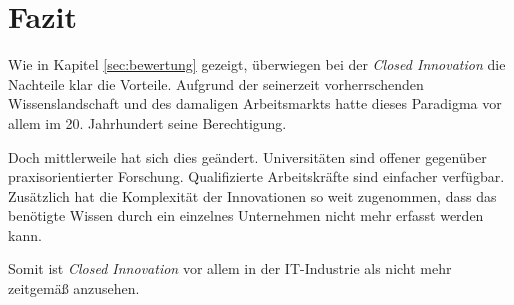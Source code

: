 \section{Fazit}\label{sec:fazit}
Wie in Kapitel \ref{sec:bewertung} gezeigt, überwiegen bei der \textit{Closed Innovation}
die Nachteile klar die Vorteile.
Aufgrund der seinerzeit vorherrschenden Wissenslandschaft und des damaligen Arbeitsmarkts
hatte dieses Paradigma vor allem im 20. Jahrhundert seine Berechtigung.

Doch mittlerweile hat sich dies geändert.
Universitäten sind offener gegenüber praxisorientierter Forschung.
Qualifizierte Arbeitskräfte sind einfacher verfügbar.
Zusätzlich hat die Komplexität der Innovationen so weit zugenommen,
dass das benötigte Wissen durch ein einzelnes Unternehmen nicht mehr erfasst werden kann.

Somit ist \textit{Closed Innovation} vor allem in der IT-Industrie als nicht mehr zeitgemäß anzusehen.